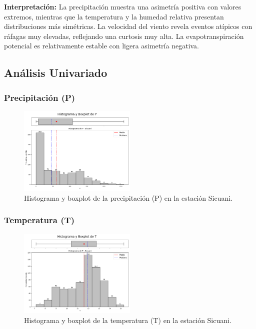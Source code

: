\textbf{Interpretación:} La precipitación muestra una asimetría positiva con valores extremos, mientras que la temperatura y la humedad relativa presentan distribuciones más simétricas. La velocidad del viento revela eventos atípicos con ráfagas muy elevadas, reflejando una curtosis muy alta. La evapotranspiración potencial es relativamente estable con ligera asimetría negativa.

\subsection{Análisis Univariado}

\subsubsection*{Precipitación (P)}
\begin{figure}[H]
\centering
\includegraphics[width=0.5\textwidth]{resultados/por_estacion_meteorologica/Sicuani/P_histograma.png}
\caption{Histograma y boxplot de la precipitación (P) en la estación Sicuani.}
\label{fig:sicuani_P}
\end{figure}

\subsubsection*{Temperatura (T)}
\begin{figure}[H]
\centering
\includegraphics[width=0.5\textwidth]{resultados/por_estacion_meteorologica/Sicuani/T_histograma.png}
\caption{Histograma y boxplot de la temperatura (T) en la estación Sicuani.}
\label{fig:sicuani_T}
\end{figure}

